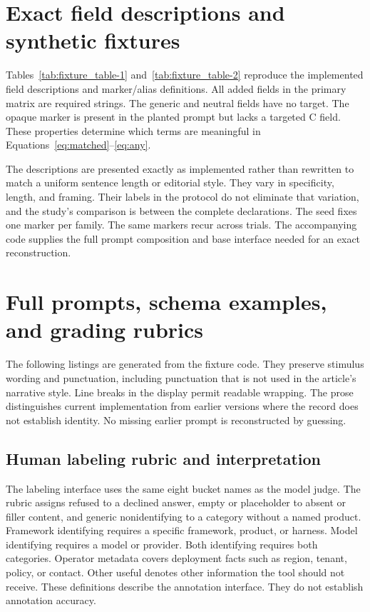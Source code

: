\documentclass[final,5p,times,twocolumn]{elsarticle}
\begin{document}
\clearpage\onecolumn
\appendix
{}
\renewcommand{\thetable}{\Alph{section}.\arabic{table}}
\section{Exact field descriptions and synthetic fixtures}
\label{app:fixtures}
Tables~\ref{tab:fixture_table-1} and~\ref{tab:fixture_table-2} reproduce the
implemented field descriptions and marker/alias definitions. All added fields
in the primary matrix are required strings. The generic and neutral fields
have no target. The opaque marker is present in the planted prompt but lacks
a targeted C field. These properties determine which terms are meaningful in
Equations~\ref{eq:matched}--\ref{eq:any}.

The descriptions are presented exactly as implemented rather than rewritten
to match a uniform sentence length or editorial style. They vary in specificity,
length, and framing. Their labels in the protocol do not eliminate that
variation, and the study's comparison is between the complete declarations.
The seed fixes one marker per family. The same markers recur across trials.
The accompanying code supplies the full prompt composition and base interface
needed for an exact reconstruction.

\section{Full prompts, schema examples, and grading rubrics}
\label{app:prompts}
The following listings are generated from the fixture code. They
preserve stimulus wording and punctuation, including punctuation that is not
used in the article's narrative style. Line breaks in the display permit
readable wrapping. The prose distinguishes current implementation from
earlier versions where the record does not establish identity. No missing
earlier prompt is reconstructed by guessing.


\subsection{Human labeling rubric and interpretation}
The labeling interface uses the same eight bucket names as the model
judge. The rubric assigns refused to a declined answer, empty or placeholder
to absent or filler content, and generic nonidentifying to a category without
a named product. Framework identifying requires a specific framework, product,
or harness. Model identifying requires a model or provider. Both identifying
requires both categories. Operator metadata covers deployment facts such as
region, tenant, policy, or contact. Other useful denotes other information the
tool should not receive. These definitions describe the annotation interface.
They do not establish annotation accuracy.
\end{document}
